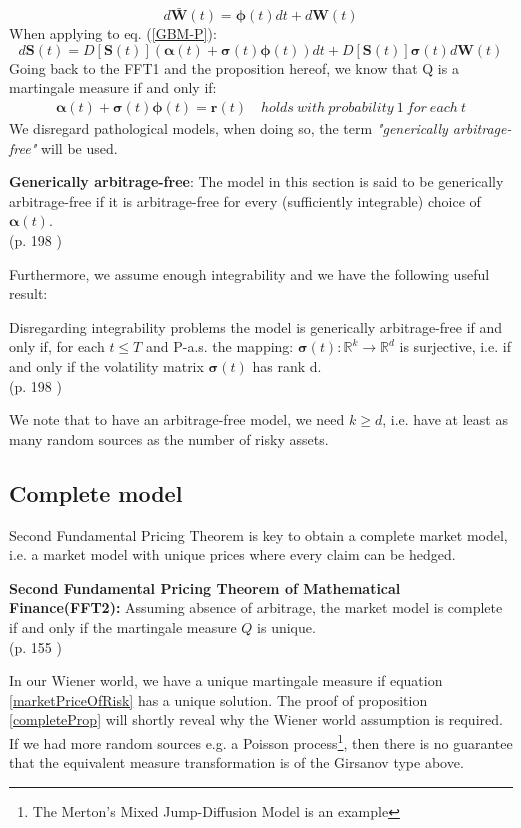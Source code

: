$$d\bm{\bar{W}}(t)=\bm{\phi}(t)dt + d\bm{W}(t)$$
When applying to eq. (\ref{GBM-P}):
$$d\bm{S}(t)=D[\bm{S}(t)](\bm{\alpha}(t)+\bm{\sigma}(t)\bm{\phi}(t))dt+D[\bm{S}(t)]\bm{\sigma}(t)d\bm{W}(t)$$
Going back to the FFT1 and the proposition hereof, we know that Q is a martingale measure if and only if:
\begin{align}\label{marketPriceOfRisk}
\bm{\alpha}(t)+\bm{\sigma}(t)\bm{\phi}(t)=\textbf{r}(t) \quad holds \ with \ probability \ 1 \ for \ each \ t
\end{align}
We disregard pathological models, when doing so, the term \textsl{"generically arbitrage-free"} will be used. 

\theoremstyle{definition}
\begin{definition}{\textbf{Generically arbitrage-free}:}
The model in this section is said to be generically arbitrage-free if it is arbitrage-free for every (sufficiently integrable) choice of $\bm{\alpha}(t)$.
\\ \null \hfill (p. 198 \parencite{finKont})
\end{definition}

Furthermore, we assume enough integrability and we have the following useful result:
\theoremstyle{proposition}
\begin{proposition}{}\label{arbitrageFreeProp}
Disregarding integrability problems the model is generically arbitrage-free if and only if, for each $t\leq T$ and P-a.s. the mapping:
$\bm{\sigma}(t):\mathbb{R}^k \to \mathbb{R}^d$ is surjective, i.e. if and only if the volatility matrix $\bm{\sigma}(t)$ has rank d.
\\ \null \hfill(p. 198 \parencite{finKont})
\end{proposition}
We note that to have an arbitrage-free model, we need $k\geq d$, i.e. have at least as many random sources as the number of risky assets. 

\subsection{Complete model}
Second Fundamental Pricing Theorem is key to obtain a complete market model, i.e. a market model with unique prices where every claim can be hedged.
\begin{theorem}\label{FFT2}
\textbf{Second Fundamental Pricing Theorem of Mathematical Finance(FFT2): } Assuming absence of arbitrage, the market model is complete if and only if the martingale measure $Q$ is unique.
\\ \null \hfill (p. 155 \parencite{finKont})
\end{theorem}
In our Wiener world, we have a unique martingale measure if equation \ref{marketPriceOfRisk} has a unique solution. The proof of proposition \ref{completeProp} will shortly reveal why the Wiener world assumption is required. If we had more random sources e.g. a Poisson process\footnote{The Merton's Mixed Jump-Diffusion Model is an example}, then there is no guarantee that the equivalent measure transformation is of the Girsanov type above. 

